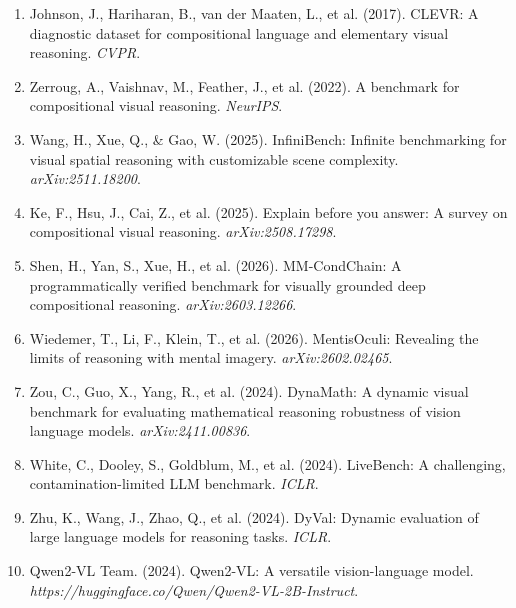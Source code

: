 \documentclass[11pt,a4paper]{article}
\begin{document}
\begin{enumerate}

\item Johnson, J., Hariharan, B., van der Maaten, L., et al. (2017). CLEVR: A diagnostic dataset for compositional language and elementary visual reasoning. \textit{CVPR}.

\item Zerroug, A., Vaishnav, M., Feather, J., et al. (2022). A benchmark for compositional visual reasoning. \textit{NeurIPS}.

\item Wang, H., Xue, Q., \& Gao, W. (2025). InfiniBench: Infinite benchmarking for visual spatial reasoning with customizable scene complexity. \textit{arXiv:2511.18200}.

\item Ke, F., Hsu, J., Cai, Z., et al. (2025). Explain before you answer: A survey on compositional visual reasoning. \textit{arXiv:2508.17298}.

\item Shen, H., Yan, S., Xue, H., et al. (2026). MM-CondChain: A programmatically verified benchmark for visually grounded deep compositional reasoning. \textit{arXiv:2603.12266}.

\item Wiedemer, T., Li, F., Klein, T., et al. (2026). MentisOculi: Revealing the limits of reasoning with mental imagery. \textit{arXiv:2602.02465}.

\item Zou, C., Guo, X., Yang, R., et al. (2024). DynaMath: A dynamic visual benchmark for evaluating mathematical reasoning robustness of vision language models. \textit{arXiv:2411.00836}.

\item White, C., Dooley, S., Goldblum, M., et al. (2024). LiveBench: A challenging, contamination-limited LLM benchmark. \textit{ICLR}.

\item Zhu, K., Wang, J., Zhao, Q., et al. (2024). DyVal: Dynamic evaluation of large language models for reasoning tasks. \textit{ICLR}.

\item Qwen2-VL Team. (2024). Qwen2-VL: A versatile vision-language model. \textit{https://huggingface.co/Qwen/Qwen2-VL-2B-Instruct}.

\end{enumerate}
\end{document}
